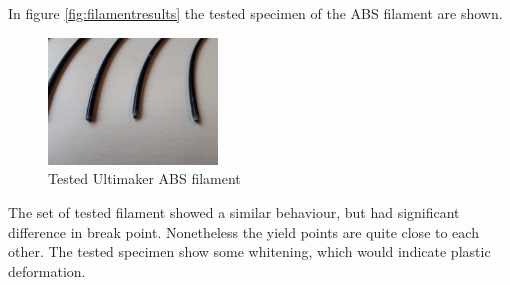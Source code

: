 In figure \ref{fig:filamentresults} the tested specimen of the ABS filament are shown.
\begin{figure}[H]
    \centering
    \includegraphics[width=0.40\textwidth]{chapter_5_Experimentaltesting/figures/Imagefilament.jpg}
    \caption{Tested Ultimaker ABS filament}
    \label{fig:filamentspecimen}
\end{figure}
The set of tested filament showed a similar behaviour, but had significant difference in break point. Nonetheless the yield points are quite close to each other. The tested specimen show some whitening, which would indicate plastic deformation.  

